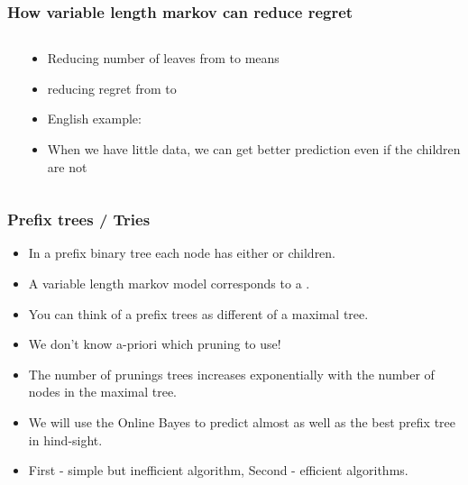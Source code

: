 \documentclass{beamer}
\begin{document}

\begin{frame}
\frametitle{How variable length markov can reduce regret}
\begin{columns}
\begin{column}[T]{5cm}
\end{column}
\begin{column}[t]{8cm}
\begin{itemize}
\item Reducing number of leaves from  to  means 
\item reducing regret from  to 
\item English example: \\
\pause {} \pause {}
\item When we have little data, we can get better prediction even if the children are not 
\end{itemize}
\end{column}
\end{columns}
\end{frame}

\begin{frame}
\frametitle{Prefix trees / Tries}
\begin{itemize}
\item In a prefix binary tree each node has either  or  children.
\item A variable length markov model corresponds to a .
\item You can think of a prefix trees as different  of a
  maximal tree.
\item We don't know a-priori which pruning to use!
\item The number of prunings trees increases exponentially with the
  number of nodes in the maximal tree.
\item We will use the Online Bayes to predict almost as well as the
  best prefix tree in hind-sight.
\item First - simple but inefficient algorithm, Second - efficient algorithms.
\end{itemize}
\end{frame}
\end{document}
